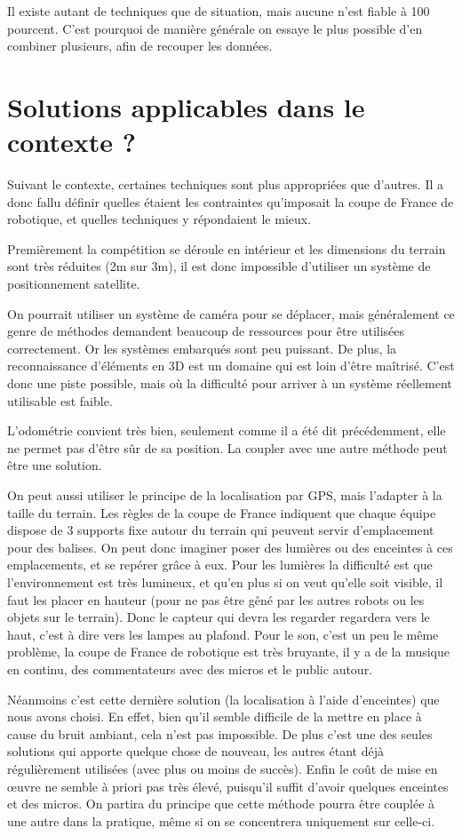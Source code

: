 \documentclass[12pt,a4paper]{report}
\begin{document}
Il existe autant de techniques que de situation, mais aucune n'est fiable à 100 pourcent. C'est pourquoi de manière générale on essaye le plus possible d'en combiner plusieurs, afin de recouper les données.

\section{Solutions applicables dans le contexte ?}

Suivant le contexte, certaines techniques sont plus appropriées que d'autres. Il a donc fallu définir quelles étaient les contraintes qu'imposait la coupe de France de robotique, et quelles techniques y répondaient le mieux.

Premièrement la compétition se déroule en intérieur et les dimensions du terrain sont très réduites (2m sur 3m), il est donc impossible d'utiliser un système de positionnement satellite.

On pourrait utiliser un système de caméra pour se déplacer, mais généralement ce genre de méthodes demandent beaucoup de ressources pour être utilisées correctement. Or les systèmes embarqués sont peu puissant. De plus, la reconnaissance d'éléments en 3D est un domaine qui est loin d'être maîtrisé.  C'est donc une piste possible, mais où la difficulté pour arriver à un système réellement utilisable est faible.

L'odométrie convient très bien, seulement comme il a été dit précédemment, elle ne permet pas d'être sûr de sa position. La coupler avec une autre méthode peut être une solution.

On peut aussi utiliser le principe de la localisation par GPS, mais l'adapter à la taille du terrain. Les règles de la coupe de France indiquent que chaque équipe dispose de 3 supports fixe autour du terrain qui peuvent servir d'emplacement pour des balises. On peut donc imaginer poser des lumières ou des enceintes à ces emplacements, et se repérer grâce à eux. Pour les lumières la difficulté est que l'environnement est très lumineux, et qu'en plus si on veut qu'elle soit visible, il faut les placer en hauteur (pour ne pas être gêné par les autres robots ou les objets sur le terrain). Donc le capteur qui devra les regarder regardera vers le haut, c'est à dire vers les lampes au plafond. Pour le son, c'est un peu le même problème, la coupe de France de robotique est très bruyante, il y a de la musique en continu, des commentateurs avec des micros et le public autour.

Néanmoins c'est cette dernière solution (la localisation à l'aide d'enceintes) que nous avons choisi. En effet, bien qu'il semble difficile de la mettre en place à cause du bruit ambiant, cela n'est pas impossible. De plus c'est une des seules solutions qui apporte quelque chose de nouveau, les autres étant déjà régulièrement utilisées (avec plus ou moins de succès). Enfin le coût de mise en œuvre ne semble à priori pas très élevé, puisqu'il suffit d'avoir quelques enceintes et des micros. On partira du principe que cette méthode pourra être couplée à une autre dans la pratique, même si on se concentrera uniquement sur celle-ci.
\end{document}
